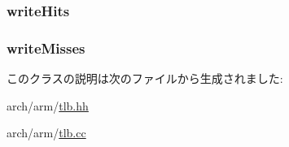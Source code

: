 \label{classArmISA_1_1TLB_aaf48f6b8c76d54c75a6156c32ac6405f}
\hypertarget{classArmISA_1_1TLB_a1d93d3754ee97de787330f7620867026}{
\subsubsection[{writeHits}]{ {\bf writeHits}}}
\label{classArmISA_1_1TLB_a1d93d3754ee97de787330f7620867026}
\hypertarget{classArmISA_1_1TLB_a607353d27be8640c6f48a295794322d6}{
\subsubsection[{writeMisses}]{ {\bf writeMisses}}}
\label{classArmISA_1_1TLB_a607353d27be8640c6f48a295794322d6}


このクラスの説明は次のファイルから生成されました:\begin{DoxyCompactItemize}
\item 
arch/arm/\hyperlink{arch_2arm_2tlb_8hh}{tlb.hh}\item 
arch/arm/\hyperlink{arch_2arm_2tlb_8cc}{tlb.cc}\end{DoxyCompactItemize}
